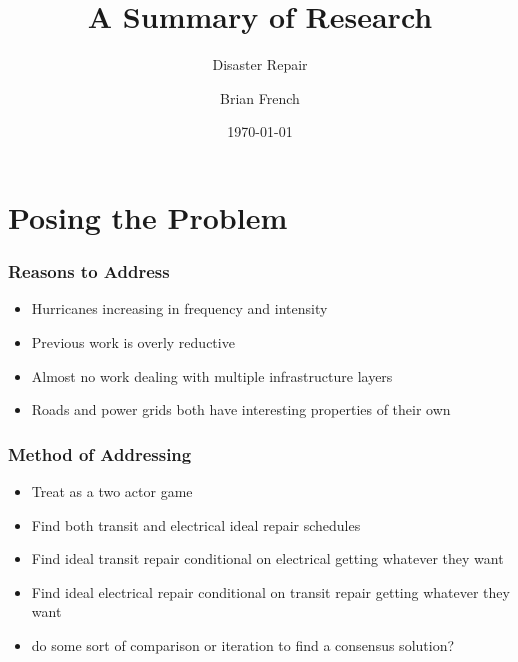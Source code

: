 \documentclass[t, pdftex]{beamer}
\title{A Summary of Research}
\subtitle{Disaster Repair}
\author{Brian French}
\institute{Department of Industrial Engineering}
\date{\today}
\begin{document}
\titleframe 

\section{Posing the Problem}

\begin{frame}
    \frametitle{Reasons to Address}

    \begin{itemize}
        \item Hurricanes increasing in frequency and intensity
        \item Previous work is overly reductive 
        \item Almost no work dealing with multiple infrastructure layers
        \item Roads and power grids both have interesting properties of their own
    \end{itemize}
\end{frame}

\begin{frame}
    \frametitle{Method of Addressing}

    \begin{itemize}
        \item Treat as a two actor game
        \item Find both transit and electrical ideal repair schedules
        \item Find ideal transit repair conditional on electrical getting whatever they want
        \item Find ideal electrical repair conditional on transit repair getting whatever they want
        \item do some sort of comparison or iteration to find a consensus solution?
    \end{itemize}
\end{frame}
\end{document}
